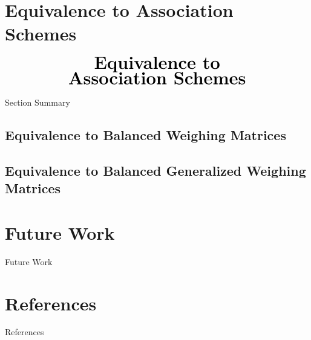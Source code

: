 \documentclass{beamer}
\begin{document}

\section{Equivalence to Association Schemes}

\begin{frame}
  \[
    \begin{array}{c}
      \text{\huge\bf Equivalence to}
      \\
      \text{\huge\bf Association Schemes}
    \end{array}
  \]
\end{frame}

\begin{frame}{Section Summary}
  \tableofcontents[sections={5}]
\end{frame}

\subsection{Equivalence to Balanced Weighing Matrices}

\begin{frame}


  
\end{frame}

\subsection{Equivalence to Balanced Generalized Weighing Matrices}


\section{Future Work}

\begin{frame}{Future Work}
\end{frame}


\section{References}

\begin{frame}{References}
  
  
\end{frame}
\end{document}
